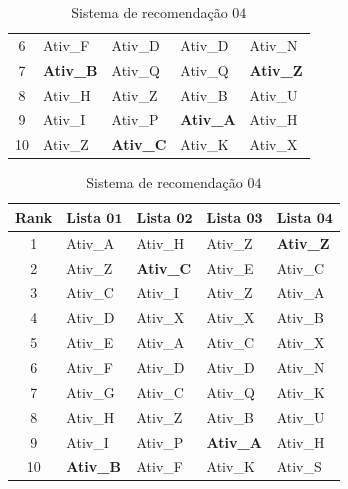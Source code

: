 \begin{table}[!htb]
\begin{subtable}{.5\linewidth}
\begin{tabular}{|c|l|l|l|l|}
			6                & Ativ\_F   			& Ativ\_D    			& Ativ\_D    		& Ativ\_N                    \\
			7                & \textbf{Ativ\_B}		& Ativ\_Q				& Ativ\_Q    		& \textbf{Ativ\_Z}           \\
			8                & Ativ\_H   			& Ativ\_Z    			& Ativ\_B   		& Ativ\_U	                 \\
			9                & Ativ\_I    			& Ativ\_P   			& \textbf{Ativ\_A}	& Ativ\_H	                 \\
			10               & Ativ\_Z   			& \textbf{Ativ\_C}		& Ativ\_K    		& Ativ\_X           \\ \hline
		\end{tabular}
		\caption{Sistema de recomendação \(03\)}
		\label{TABELAO:SISTEMA_RECOMENDACAO_03}
	\end{subtable}%
	\begin{subtable}{.5\linewidth}
		\centering
		\begin{tabular}{|c|l|l|l|l|} \hline 
			\textbf{Rank} & \textbf{Lista} \(\mathbf{01}\) & \textbf{Lista} \(\mathbf{02}\) & \textbf{Lista} \(\mathbf{03}\) & \textbf{Lista} \(\mathbf{04}\) \\ \hline 
			1                & Ativ\_A			    & Ativ\_H    			& Ativ\_Z   		& \textbf{Ativ\_Z}           \\
			2                & Ativ\_Z    			& \textbf{Ativ\_C}		& Ativ\_E   		& Ativ\_C 	                 \\
			3                & Ativ\_C    			& Ativ\_I    			& Ativ\_Z			& Ativ\_A                    \\
			4                & Ativ\_D   			& Ativ\_X    			& Ativ\_X    		& Ativ\_B	                 \\
			5                & Ativ\_E   			& Ativ\_A			  	& Ativ\_C    		& Ativ\_X 	         		 \\
			6                & Ativ\_F   			& Ativ\_D    			& Ativ\_D    		& Ativ\_N                    \\
			7                & Ativ\_G   			& Ativ\_C    			& Ativ\_Q    		& Ativ\_K	                 \\
			8                & Ativ\_H   			& Ativ\_Z    			& Ativ\_B   		& Ativ\_U	                 \\
			9                & Ativ\_I    			& Ativ\_P   			& \textbf{Ativ\_A}	& Ativ\_H	                 \\
			10               & \textbf{Ativ\_B}  	& Ativ\_F    			& Ativ\_K    		& Ativ\_S		     \\ \hline
		\end{tabular}
		\caption{Sistema de recomendação \(04\)}
		\label{TABELAO:SISTEMA_RECOMENDACAO_04}
	\end{subtable}
	\label{TABELAO}
	\vspace{0.1cm}
	\source{\varAutorData}
\end{table}
